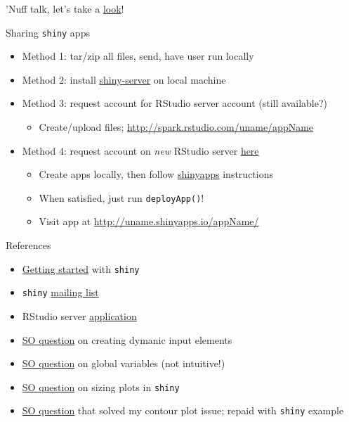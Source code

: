 \documentclass[sans,aspectratio=169,presentation,bigger,fleqn]{beamer}
\begin{document}
\begin{frame}[label=sec-20]{}
\vfill
\begin{center}
'Nuff talk, let's take a \href{http://spark.rstudio.com/jwhendy/insurance-visualizer}{look}!
\end{center}
\vfill
\end{frame}
\begin{frame}[fragile,label=sec-21]{Sharing \texttt{shiny} apps}
 \begin{itemize}
\item Method 1: tar/zip all files, send, have user run locally
\item Method 2: install \href{http://www.rstudio.com/shiny/server/}{shiny-server} on local machine

\item Method 3: request account for RStudio server account (still available?)
\begin{itemize}
\item Create/upload files; \url{http://spark.rstudio.com/uname/appName}
\end{itemize}

\item Method 4: request account on \emph{new} RStudio server \href{http://www.shinyapps.io/signup.html}{here}
\begin{itemize}
\item Create apps locally, then follow \href{https://github.com/rstudio/shinyapps/}{shinyapps} instructions
\item When satisfied, just run \texttt{deployApp()}!
\item Visit app at \url{http://uname.shinyapps.io/appName/}
\end{itemize}
\end{itemize}
\end{frame}
\begin{frame}[fragile,label=sec-22]{References}
 \begin{itemize}
\item \href{http://www.rstudio.com/shiny/}{Getting started} with \texttt{shiny}
\item \texttt{shiny} \href{https://groups.google.com/forum/#!forum/shiny-discuss}{mailing list}
\item RStudio server \href{https://shinyapps.io/}{application}
\item \href{http://stackoverflow.com/questions/19130455/create-dynamic-number-of-input-elements-with-r-shiny}{SO question} on creating dymanic input elements
\item \href{http://stackoverflow.com/questions/17683933/set-global-object-in-shiny}{SO question} on global variables (not intuitive!)
\item \href{http://stackoverflow.com/questions/17838709/scale-and-size-of-plot-in-rstudio-shiny}{SO question} on sizing plots in \texttt{shiny}
\item \href{http://stackoverflow.com/questions/17958730/faceting-a-set-of-contour-plots-in-ggplot-r}{SO question} that solved my contour plot issue; repaid with \texttt{shiny} example
\end{itemize}
\end{frame}
\end{document}
